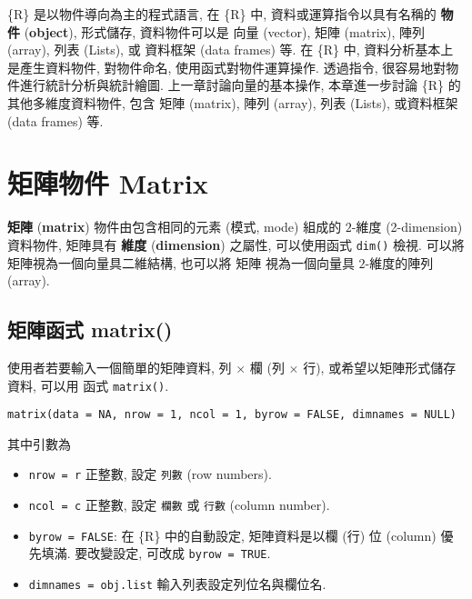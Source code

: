 \documentclass[
]{book}
\providecommand{\tightlist}{%
  \setlength{\itemsep}{0pt}\setlength{\parskip}{0pt}}
\begin{document}
\{R\} 是以物件導向為主的程式語言,
在 \{R\} 中, 資料或運算指令以具有名稱的
\textbf{物件}
(\textbf{object}),
形式儲存,
資料物件可以是 向量 (vector),
矩陣 (matrix),
陣列 (array),
列表 (Lists),
或 資料框架 (data frames) 等.
在 \{R\} 中, 資料分析基本上是產生資料物件,
對物件命名, 使用函式對物件運算操作.
透過指令, 很容易地對物件進行統計分析與統計繪圖.
上一章討論向量的基本操作,
本章進一步討論 \{R\} 的其他多維度資料物件,
包含 矩陣 (matrix),
陣列 (array),
列表 (Lists),
或資料框架 (data frames) 等.

\hypertarget{ux77e9ux9663ux7269ux4ef6-matrix}{%
\section{矩陣物件 Matrix}\label{ux77e9ux9663ux7269ux4ef6-matrix}}

\textbf{矩陣}
(\textbf{matrix})
物件由包含相同的元素 (模式, mode) 組成的 \(2\)-維度 (2-dimension) 資料物件,
矩陣具有
\textbf{維度}
(\textbf{dimension})
之屬性,
可以使用函式 \texttt{dim()} 檢視.
可以將矩陣視為一個向量具二維結構,
也可以將 矩陣 視為一個向量具 \(2\)-維度的陣列 (array).

\hypertarget{ux77e9ux9663ux51fdux5f0f-matrix}{%
\subsection{矩陣函式 matrix()}\label{ux77e9ux9663ux51fdux5f0f-matrix}}

使用者若要輸入一個簡單的矩陣資料,
列 \(\times\) 欄
(列 \(\times\) 行),
或希望以矩陣形式儲存資料,
可以用 函式
\texttt{matrix()}.

\begin{verbatim}
matrix(data = NA, nrow = 1, ncol = 1, byrow = FALSE, dimnames = NULL)           
\end{verbatim}

其中引數為

\begin{itemize}
\tightlist
\item
  \texttt{nrow\ =\ r} 正整數, 設定 \texttt{列數} (row numbers).
\item
  \texttt{ncol\ =\ c} 正整數, 設定 \texttt{欄數} 或 \texttt{行數} (column number).
\item
  \texttt{byrow\ =\ FALSE}:
  在 \{R\} 中的自動設定,
  矩陣資料是以欄 (行) 位 (column) 優先填滿.
  要改變設定,
  可改成 \texttt{byrow\ =\ TRUE}.
\item
  \texttt{dimnames\ =\ obj.list} 輸入列表設定列位名與欄位名.
\end{itemize}
\end{document}
